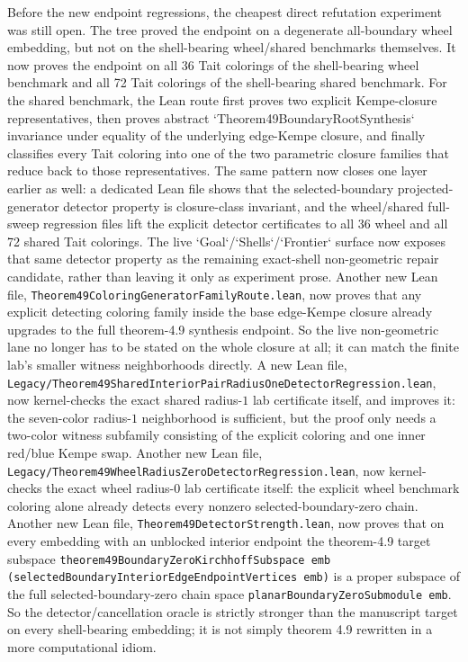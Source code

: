 \documentclass[11pt]{article}
\begin{document}
Before the new endpoint regressions, the cheapest direct refutation experiment
was still open.  The tree proved the endpoint on a degenerate all-boundary
wheel embedding, but not on the shell-bearing wheel/shared benchmarks
themselves.  It now proves the endpoint on all 36 Tait colorings of the
shell-bearing wheel benchmark and all 72 Tait colorings of the shell-bearing
shared benchmark.  For the shared benchmark, the Lean route first proves two
explicit Kempe-closure representatives, then proves abstract
`Theorem49BoundaryRootSynthesis` invariance under equality of the underlying
edge-Kempe closure, and finally classifies every Tait coloring into one of the
two parametric closure families that reduce back to those representatives.
The same pattern now closes one layer earlier as well: a dedicated Lean file
shows that the selected-boundary projected-generator detector property is
closure-class invariant, and the wheel/shared full-sweep regression files lift
the explicit detector certificates to all 36 wheel and all 72 shared Tait
colorings.  The live `Goal`/`Shells`/`Frontier` surface now exposes that same
detector property as the remaining exact-shell non-geometric repair candidate,
rather than leaving it only as experiment prose.  Another new Lean file,
\verb|Theorem49ColoringGeneratorFamilyRoute.lean|, now proves that any
explicit detecting coloring family inside the base edge-Kempe closure already
upgrades to the full theorem-4.9 synthesis endpoint.  So the live
non-geometric lane no longer has to be stated on the whole closure at all; it
can match the finite lab's smaller witness neighborhoods directly.  A new Lean
file,
\verb|Legacy/Theorem49SharedInteriorPairRadiusOneDetectorRegression.lean|,
now kernel-checks the exact shared radius-$1$ lab certificate itself, and
improves it: the seven-color radius-$1$ neighborhood is sufficient, but the
proof only needs a two-color witness subfamily consisting of the explicit
coloring and one inner red/blue Kempe swap.  Another new Lean file,
\verb|Legacy/Theorem49WheelRadiusZeroDetectorRegression.lean|, now
kernel-checks the exact wheel radius-$0$ lab certificate itself: the explicit
wheel benchmark coloring alone already detects every nonzero
selected-boundary-zero chain.  Another new Lean file,
\verb|Theorem49DetectorStrength.lean|, now proves that on every embedding with
an unblocked interior endpoint the theorem-4.9 target subspace
\verb|theorem49BoundaryZeroKirchhoffSubspace emb (selectedBoundaryInteriorEdgeEndpointVertices emb)|
is a proper subspace of the full selected-boundary-zero chain space
\verb|planarBoundaryZeroSubmodule emb|.  So the detector/cancellation oracle is
strictly stronger than the manuscript target on every shell-bearing embedding;
it is not simply theorem 4.9 rewritten in a more computational idiom.
\end{document}
